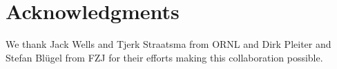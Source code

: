 \documentclass{llncs}
\begin{document}
\section*{Acknowledgments}
We thank Jack Wells and Tjerk Straatsma from ORNL and Dirk Pleiter and Stefan Bl\"ugel from FZJ 
for their efforts making this collaboration possible.

\end{document}
